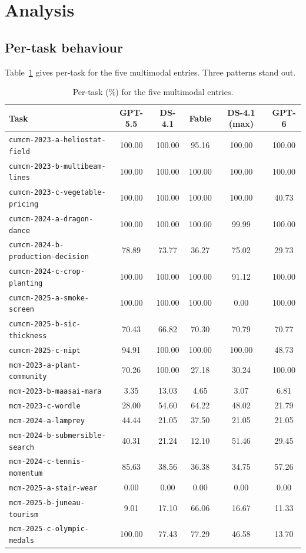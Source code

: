 \section{Analysis}
\label{sec:analysis}

\subsection{Per-task behaviour}
Table~\ref{tab:pertask} gives per-task \oeval{} for the five multimodal entries. Three patterns stand out.

\begin{table}[t]
\centering
\small
\caption{Per-task \oeval{} (\%) for the five multimodal entries.}
\label{tab:pertask}
\begin{tabular}{@{}lccccc@{}}
\toprule
Task & GPT-5.5 & DS-4.1 & Fable & DS-4.1 (max) & GPT-6 \\
\midrule
\texttt{cumcm-2023-a-heliostat-field} & 100.00 & 100.00 & 95.16 & 100.00 & 100.00 \\
\texttt{cumcm-2023-b-multibeam-lines} & 100.00 & 100.00 & 100.00 & 100.00 & 100.00 \\
\texttt{cumcm-2023-c-vegetable-pricing} & 100.00 & 100.00 & 100.00 & 100.00 & 40.73 \\
\texttt{cumcm-2024-a-dragon-dance} & 100.00 & 100.00 & 100.00 & 99.99 & 100.00 \\
\texttt{cumcm-2024-b-production-decision} & 78.89 & 73.77 & 36.27 & 75.02 & 29.73 \\
\texttt{cumcm-2024-c-crop-planting} & 100.00 & 100.00 & 100.00 & 91.12 & 100.00 \\
\texttt{cumcm-2025-a-smoke-screen} & 100.00 & 100.00 & 100.00 & 0.00 & 100.00 \\
\texttt{cumcm-2025-b-sic-thickness} & 70.43 & 66.82 & 70.30 & 70.79 & 70.77 \\
\texttt{cumcm-2025-c-nipt} & 94.91 & 100.00 & 100.00 & 100.00 & 48.73 \\
\texttt{mcm-2023-a-plant-community} & 70.26 & 100.00 & 27.18 & 30.24 & 100.00 \\
\texttt{mcm-2023-b-maasai-mara} & 3.35 & 13.03 & 4.65 & 3.07 & 6.81 \\
\texttt{mcm-2023-c-wordle} & 28.00 & 54.60 & 64.22 & 48.02 & 21.79 \\
\texttt{mcm-2024-a-lamprey} & 44.44 & 21.05 & 37.50 & 21.05 & 21.05 \\
\texttt{mcm-2024-b-submersible-search} & 40.31 & 21.24 & 12.10 & 51.46 & 29.45 \\
\texttt{mcm-2024-c-tennis-momentum} & 85.63 & 38.56 & 36.38 & 34.75 & 57.26 \\
\texttt{mcm-2025-a-stair-wear} & 0.00 & 0.00 & 0.00 & 0.00 & 0.00 \\
\texttt{mcm-2025-b-juneau-tourism} & 9.01 & 17.10 & 66.06 & 16.67 & 11.33 \\
\texttt{mcm-2025-c-olympic-medals} & 100.00 & 77.43 & 77.29 & 46.58 & 13.70 \\
\bottomrule
\end{tabular}
\end{table}

